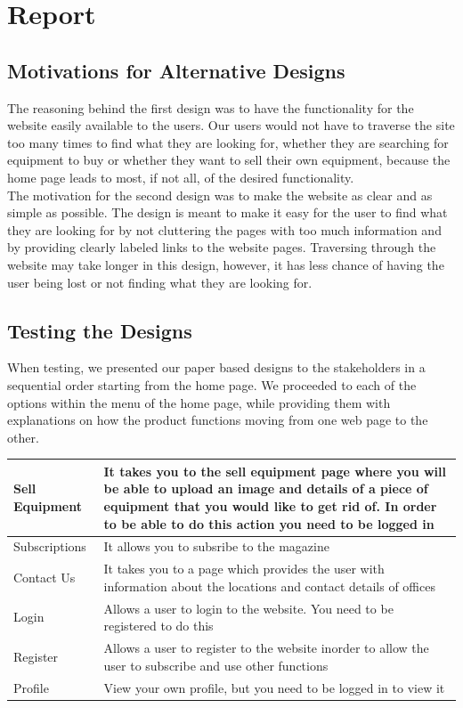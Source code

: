 \documentclass[11pt]{article}
\begin{document}
\newpage

\section{Report}
	\subsection{Motivations for Alternative Designs}
		The reasoning behind the first design was to have the functionality for the website easily available to the users. Our users would not have to traverse the site too many times to find what they are looking for, whether they are searching for equipment to buy or whether they want to sell their own equipment, because the home page leads to most, if not all, of the desired functionality. \\
		
		The motivation for the second design was to make the website as clear and as simple as possible. The design is meant to make it easy for the user to find what they are looking for by not cluttering the pages with too much information and by providing clearly labeled links to the website pages. Traversing through the website may take longer in this design, however, it has less chance of having the user being lost or not finding what they are looking for.
	
	\subsection{Testing the Designs}
		When testing, we presented our paper based designs to the stakeholders in a sequential order starting from the home page. We proceeded to each of the options within the menu of the home page, while providing them with explanations on how the product functions moving from one web page to the other. 
		
		\begin{center}
			\begin{tabular}{ |p{3cm}||p{10cm}| } 
				\hline
				Sell Equipment &  It takes you to the sell equipment page where you	 will be able to upload an image and details of a piece of equipment that you would like to get rid of. In order to be able to do this  action you need to be logged in \\ 
				\hline
				Subscriptions &  It allows you to subsribe to the magazine\\ 
				\hline
				Contact Us & It takes you to a page which provides the user with information about the locations and contact details of offices \\ 
				\hline
				Login & Allows a user to login to the website. You need to be registered to do this \\ 
				\hline
				Register & Allows a user to register to the website inorder to allow the user to subscribe and use other functions \\ 
				\hline
				Profile & View your own profile, but you need to be logged in to view it \\
				\hline
			\end{tabular} 
		\end{center}
		
\end{document}
